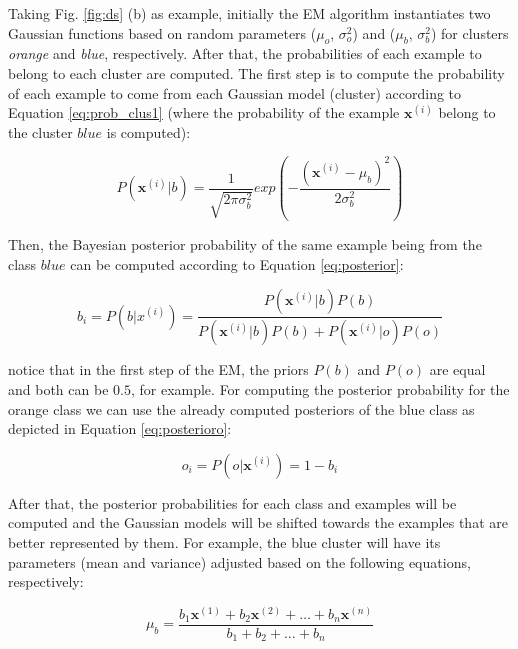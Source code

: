 Taking Fig. \ref{fig:ds} (b) as example, initially the EM algorithm instantiates two Gaussian functions based on random parameters ($\mu_o$, $\sigma^{2}_o$) and ($\mu_b$, $\sigma^{2}_b$) for clusters \textit{orange} and \textit{blue}, respectively. After that, the probabilities of each example to belong to each cluster are computed. The first step is to compute the probability of each example to come from each Gaussian model (cluster) according to Equation \ref{eq:prob_clus1} (where the probability of the example $\mathbf{x}^{(i)}$ belong to the cluster $blue$ is computed):

\begin{equation}
    P(\mathbf{x}^{(i)}|b) = \frac{1}{\sqrt{2 \pi \sigma^{2}_b}} exp \left( -\frac{(\mathbf{x}^{(i)} - \mu_b)^{2}}{2\sigma^{2}_b} \right) 
    \label{eq:prob_clus1}
\end{equation}

Then, the Bayesian posterior probability of the same example being from the class $blue$ can be computed according to Equation \ref{eq:posterior}:

\begin{equation}
    b_i = P(b | x^{(i)}) = \frac{P(\mathbf{x}^{(i)}|b) P(b)}{P(\mathbf{x}^{(i)}|b) P(b) + P(\mathbf{x}^{(i)}|o) P(o)}
    \label{eq:posterior}
\end{equation}

\noindent notice that in the first step of the EM, the priors $P(b)$ and $P(o)$ are equal and both can be $0.5$, for example. For computing the posterior probability for the orange class we can use the already computed posteriors of the blue class as depicted in Equation \ref{eq:posterioro}:

\begin{equation}
    o_i = P(o | \mathbf{x}^{(i)}) = 1 - b_i
    \label{eq:posterioro}
\end{equation}

After that, the posterior probabilities for each class and examples will be computed and the Gaussian models will be shifted towards the examples that are better represented by them. For example, the blue cluster will have its parameters (mean and variance) adjusted based on the following equations, respectively:

\begin{equation}
    \mu_b = \frac{b_{1}\mathbf{x}^{(1)} + b_{2}\mathbf{x}^{(2)} + \ldots + b_{n}\mathbf{x}^{(n)}}{b_{1} + b_{2} + \ldots + b_{n}}
\end{equation}


